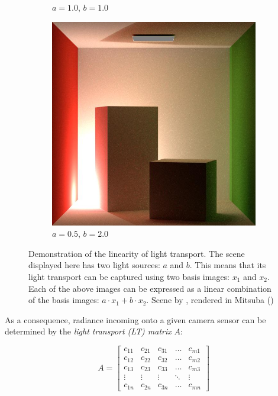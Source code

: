 \begin{figure}[ht]
\begin{subfigure}[b]{0.24\textwidth}
        \caption*{\(a = 1.0\), \(b = 1.0\)}
    \end{subfigure}
    \hfill
    \begin{subfigure}[b]{0.24\textwidth}
        \centering
        \includegraphics[width=\textwidth]{images/02-linear_lt_comb2.jpg}
        \caption*{\(a = 0.5\), \(b = 2.0\)}
    \end{subfigure}
    \caption{Demonstration of the linearity of light transport. The scene displayed here has two light sources: \(a\) and \(b\). This means that its light transport can be captured using two basis images: \(x_1\) and \(x_2\). Each of the above images can be expressed as a linear combination of the basis images: \(a \cdot x_1 + b \cdot x_2\). Scene by \citet*{Bitterli16}, rendered in Mitsuba (\citet*{Mitsuba})}
    \label{fig:background_linear_lt}
\end{figure}

As a consequence, radiance incoming onto a given camera sensor can be determined by the \textit{light transport (LT) matrix} \(A\):

\begin{equation}
    \label{eq:lt_matrix}
    A = \begin{bmatrix}
        c_{11} & c_{21} & c_{31} & \dots & c_{m1} \\
        c_{12} & c_{22} & c_{32} & \dots & c_{m2} \\
        c_{13} & c_{23} & c_{33} & \dots & c_{m3} \\
        \vdots & \vdots & \vdots & \ddots & \vdots \\
        c_{1n} & c_{2n} & c_{3n} & \dots & c_{mn}
    \end{bmatrix}
\end{equation}

